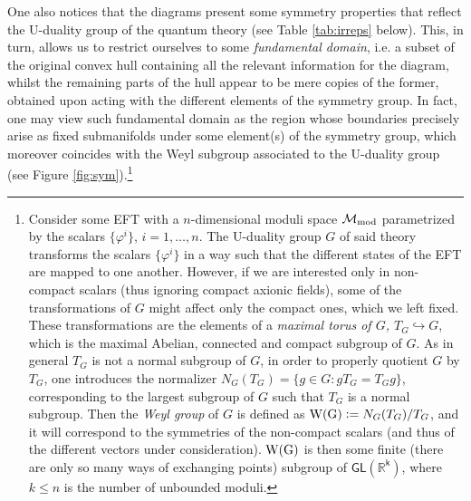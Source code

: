 One also notices that the diagrams present some symmetry properties that reflect the U-duality group of the quantum theory (see Table \ref{tab:irreps} below). This, in turn, allows us to restrict ourselves to some \emph{fundamental domain}, i.e. a subset of the original convex hull containing all the relevant information for the diagram, whilst the remaining parts of the hull appear to be mere copies of the former, obtained upon acting with the different elements of the symmetry group. In fact, one may view such fundamental domain as the region whose boundaries precisely arise as fixed submanifolds under some element(s) of the symmetry group, which moreover coincides with the Weyl subgroup associated to the U-duality group (see Figure \ref{fig:sym}).\footnote{\label{fnote.Weyl}Consider some EFT with a $n$-dimensional moduli space $\mathcal{M}_{\rm mod}$ parametrized by the scalars $\{\varphi^i\}$, $i=1, \ldots, n$. The U-duality group $G$ of said theory transforms the scalars $\{\varphi^i\}$ in a way such that the different states of the EFT are mapped to one another. However, if we are interested only in non-compact scalars (thus ignoring compact axionic fields), some of the transformations of $G$ might affect only the compact ones, which we left fixed. These transformations are the elements of a \emph{maximal torus of $G$, $T_G\hookrightarrow G$}, which is the maximal Abelian, connected and compact subgroup of $G$. As in general $T_G$ is not a normal subgroup of $G$, in order to properly quotient $G$ by $T_G$, one introduces the normalizer $N_G (T_G)=\{g\in G:gT_G=T_Gg\}$, corresponding to the largest subgroup of $G$ such that $T_G$ is a normal subgroup. Then the \emph{Weyl group} of $G$ is defined as ${\rm W(G)}:=N_G(T_G)/T_G$, and it will correspond to the symmetries of the non-compact scalars (and thus of the different vectors under consideration). ${\rm W(G)}$ is then some finite (there are only so many ways of exchanging points) subgroup of $\mathsf{GL(\mathbb{R}^{k})}$, where $k\leq n$ is the number of unbounded moduli.}
	
